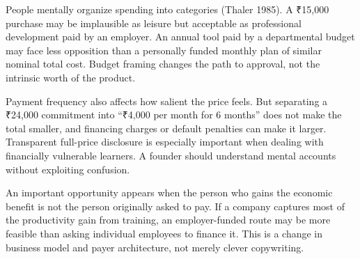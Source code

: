 People mentally organize spending into categories (Thaler 1985). A ₹15,000 purchase may be implausible as leisure but acceptable as professional development paid by an employer. An annual tool paid by a departmental budget may face less opposition than a personally funded monthly plan of similar nominal total cost. Budget framing changes the path to approval, not the intrinsic worth of the product.

Payment frequency also affects how salient the price feels. But separating a ₹24,000 commitment into ``₹4,000 per month for 6 months'' does not make the total smaller, and financing charges or default penalties can make it larger. Transparent full-price disclosure is especially important when dealing with financially vulnerable learners. A founder should understand mental accounts without exploiting confusion.

An important opportunity appears when the person who gains the economic benefit is not the person originally asked to pay. If a company captures most of the productivity gain from training, an employer-funded route may be more feasible than asking individual employees to finance it. This is a change in business model and payer architecture, not merely clever copywriting.
